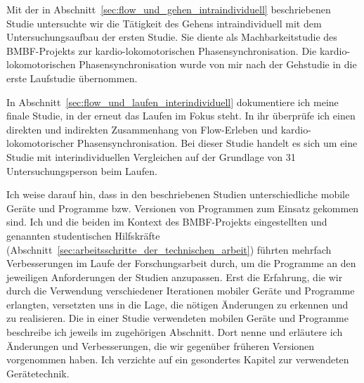 Mit der in Abschnitt~\ref{sec:flow_und_gehen_intraindividuell} beschriebenen Studie untersuchte wir die Tätigkeit des Gehens intraindividuell mit dem Untersuchungsaufbau der ersten Studie. Sie diente als Machbarkeitstudie des \acs{BMBF}-Projekts zur kardio-lokomotorischen Phasensynchronisation. Die kardio-lokomotorischen Phasensynchronisation wurde von mir nach der Gehstudie in die erste Laufstudie übernommen.    

In Abschnitt~\ref{sec:flow_und_laufen_interindividuell} dokumentiere ich meine finale Studie, in der erneut das Laufen im Fokus steht. In ihr überprüfe ich einen direkten und indirekten Zusammenhang von Flow-Erleben und kardio-lokomotorischer Phasensynchronisation. Bei dieser Studie handelt es sich um eine Studie mit interindividuellen Vergleichen auf der Grundlage von 31 Untersuchungsperson beim Laufen. 

Ich weise darauf hin, dass in den beschriebenen Studien unterschiedliche mobile Geräte und Programme bzw. Versionen von Programmen zum Einsatz gekommen sind. Ich und die  beiden im Kontext des \acs{BMBF}-Projekts eingestellten und genannten studentischen Hilfskräfte (Abschnitt~\ref{sec:arbeitsschritte_der_technischen_arbeit}) führten mehrfach Verbesserungen im Laufe der Forschungsarbeit durch, um die Programme an den jeweiligen Anforderungen der Studien anzupassen. Erst die Erfahrung, die wir durch die Verwendung verschiedener Iterationen mobiler Geräte und Programme erlangten, versetzten uns in die Lage, die nötigen Änderungen zu erkennen und zu realisieren. Die in einer Studie verwendeten mobilen Geräte und Programme beschreibe ich jeweils im zugehörigen Abschnitt. Dort nenne und erläutere ich Änderungen und Verbesserungen, die wir gegenüber früheren Versionen vorgenommen haben. Ich verzichte auf ein gesondertes Kapitel zur verwendeten Gerätetechnik.